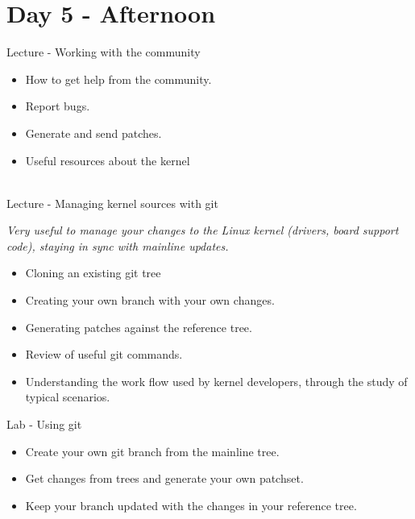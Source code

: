 \documentclass[a4paper,12pt,obeyspaces,spaces,hyphens]{article}
\begin{document}
\section{Day 5 - Afternoon}
\feagendaonecolumn
{Lecture - Working with the community}
{
  \begin{itemize}
  \item How to get help from the community.
  \item Report bugs.
  \item Generate and send patches.
  \item Useful resources about the kernel
  \end{itemize}
}
\\
\feagendatwocolumn
{Lecture - Managing kernel sources with git}
{
  {\em Very useful to manage your changes to the Linux kernel
    (drivers, board support code), staying in sync with mainline
    updates.}
  \begin{itemize}
  \item Cloning an existing git tree
  \item Creating your own branch with your own changes.
  \item Generating patches against the reference tree.
  \item Review of useful git commands.
  \item Understanding the work flow used by kernel developers, through
    the study of typical scenarios.
  \end{itemize}
}
{Lab - Using git}
{
  \begin{itemize}
  \item Create your own git branch from the mainline tree.
  \item Get changes from trees and generate your own patchset.
  \item Keep your branch updated with the changes in your reference
    tree.
  \end{itemize}
}

 
\end{document}
